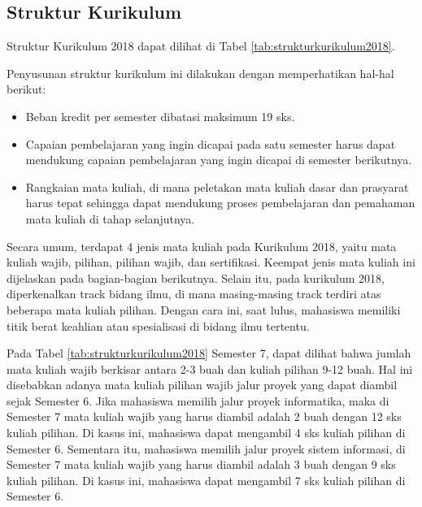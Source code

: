 \subsection{Struktur Kurikulum}

Struktur Kurikulum 2018 dapat dilihat di Tabel \ref{tab:strukturkurikulum2018}.

Penyusunan struktur kurikulum ini dilakukan dengan memperhatikan hal-hal berikut:
\begin{itemize}
	\item Beban kredit per semester dibatasi maksimum 19 sks.
	\item Capaian pembelajaran yang ingin dicapai pada satu semester harus dapat mendukung capaian pembelajaran yang ingin dicapai di semester berikutnya.
	\item Rangkaian mata kuliah, di mana peletakan mata kuliah dasar dan prasyarat harus tepat sehingga dapat mendukung proses pembelajaran dan pemahaman mata kuliah di tahap selanjutnya. 
\end{itemize}
Secara umum, terdapat 4 jenis mata kuliah pada Kurikulum 2018, yaitu mata kuliah wajib, pilihan, pilihan wajib, dan sertifikasi. Keempat jenis mata kuliah ini dijelaskan pada bagian-bagian berikutnya. Selain itu, pada kurikulum 2018, diperkenalkan track bidang ilmu, di mana masing-masing track terdiri atas beberapa mata kuliah pilihan. Dengan cara ini, saat lulus, mahasiswa memiliki titik berat keahlian atau spesialisasi di bidang ilmu tertentu.

Pada Tabel \ref{tab:strukturkurikulum2018} Semester 7, dapat dilihat bahwa jumlah mata kuliah wajib berkisar antara 2-3 buah dan kuliah pilihan 9-12 buah. Hal ini disebabkan adanya mata kuliah pilihan wajib jalur proyek yang dapat diambil sejak Semester 6. Jika mahasiswa memilih jalur proyek informatika, maka di Semester 7 mata kuliah wajib yang harus diambil adalah 2 buah dengan 12 sks kuliah pilihan. Di kasus ini, mahasiswa dapat mengambil 4 sks kuliah pilihan di Semester 6. Sementara itu, mahasiswa memilih jalur proyek sistem informasi, di Semester 7 mata kuliah wajib yang harus diambil adalah 3 buah dengan 9 sks kuliah pilihan. Di kasus ini, mahasiswa dapat mengambil 7 sks kuliah pilihan di Semester 6.

